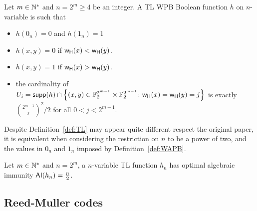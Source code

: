 \documentclass[11pt]{llncs}
\begin{document}
\begin{definition}\label{def:TL}
	Let $m \in \mathbb{N}^*$ and $n = 2^m \ge 4$ be an integer. A TL WPB Boolean function $h$ on $n$-variable is such that
	\begin{itemize}
		\item $h(0_n)=0$ and $h(1_n)=1$ 
		\item $h(x,y)=0$ if $\mathsf{w_H}(x)<\mathsf{w_H}(y)$.
		\item $h(x,y)=1$ if $\mathsf{w_H}(x)>\mathsf{w_H}(y)$.
		\item the cardinality of $U_i=\mathsf{supp}(h)\cap\left\{(x,y)\in\mathbb{F}_2^{2^{m-1}}\times \mathbb{F}_2^{2^{m-1}}\colon \mathsf{w_H}(x)=\mathsf{w_H}(y)=j\right\}$ is exactly $\binom{2^{m-1}}{j}^2/2$ for all $0<j<2^{m-1}$.
	\end{itemize}	
\end{definition}
\begin{remark}
	Despite Definition~\ref{def:TL} may appear quite different respect the original paper, it is equivalent when considering the restriction on $n$ to be a power of two, and the values in $0_n$ and $1_n$ imposed by Definition~\ref{def:WAPB}. 
\end{remark}

\begin{Prop}\label{Prop:TL}
	Let $m \in \mathbb{N}^*$ and $n=2^m$, a  $n$-variable TL function $h_n$ has optimal algebraic immunity $\mathsf{AI}(h_n)=\frac{n}{2}$.
\end{Prop}

\subsection{Reed-Muller codes}
\end{document}
